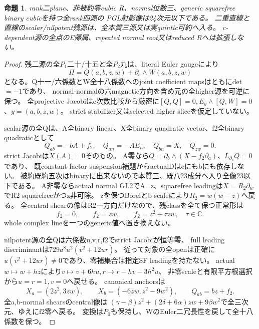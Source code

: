 \documentclass[a4paper,11pt]{ltjsarticle}
\newtheorem{proposition}{命題}[section]
\theoremstyle{definition}
\begin{document}
\begin{proposition}\label{prop:plane-nonreduced-m3-squarefree-all-G}
rank二plane、非被約零cubic R、normal位数三、generic squarefree binary cubicを持つ全rank四源の
PGL射影像は24次元以下である。
二重直線と直線のscalar/nilpotent残源は、全本質三源又は実quintic可約へ入る。
c-dependent源の全点のE帰属、repeated normal root又はreduced Rへは拡張しない。
\end{proposition}
\begin{proof}
残二源の全$P_1$二十/十五と全$P_2$九は、literal Euler gaugeにより
\[
 \Pi=Q(a,b,z,w)+\partial_c\wedge W(a,b,z,w)
\]
となる。Q十一/六係数とW全十八係数へのjoint coefficient mapsはともにdet$=-1$であり、
normal-normalの六magnetic方向を含め元の全higher源を可逆に保つ。
全projective Jacobiはc次数比較から厳密に$[Q,Q]=0,E_y\wedge[Q,W]=0$、$y=(a,b,z,w)$。
strict stabilizer又はselected higher sliceを仮定していない。

scalar源の全Qは、A全binary linear、X全binary quadratic vector、f2全binary quadraticとして
\[
 Q_{ab}=-bA+f_2,\quad Q_{an}=-A E_n,\quad Q_{bn}=X,\quad Q_{zw}=0.
\]
strict Jacobiは$X(A)=0$そのもの。
A零なら$Q=\partial_b\wedge(X-f_2\partial_a)$、$L_{\partial_b}Q=0$であり、
既constant-factor suspension補題からactualDはcにもbにも依存しない。
被約既約五次はbinaryに出来ないので本質三、既八23成分へ入り全像23以下である。
A非零ならactual normal GL2でA=z、squarefree leadingは$X=R_2\partial_w$でR2 squarefreeかつz非可除。
zを保つBorelとb-scaleにより$R_2=w(w-z)$へ戻る。
全central shearの像はR2一方向だけなので、残classを全て保つ正常形は
\[
 f_2=0,\qquad f_2=zw,\qquad f_2=z^2+\tau zw,\quad\tau\in\mathbb C.
\]
whole complex lineを一つのgeneric値へ置き換えない。

nilpotent源の全Qは六係数u,v,r,f2でstrict Jacobiが恒等零、
full leading discriminantは$729a^8u^2(v^2+12ur)$。
従って対象の全openは正確に$u(v^2+12ur)\ne0$であり、零補集合は指定SF leadingを持たない。
actual$w\mapsto w+hz$により$v\mapsto v+6hu,r\mapsto r-hv-3h^2u$、
非零scaleと有限平方根選択から$u=r=1,v=0$へ戻せる。
canonical anchorsは
\[
 X_a=(2z^2,3zw),\qquad X_b=(-6zw,z^2-9w^2),\qquad Q_{ab}=bz+f_2.
\]
全a,b-normal shearsのcentral像は
$(\gamma-\beta)z^2+(2\delta+6\alpha)zw+9\beta w^2$で全三次元、ゆえにf2零へ戻る。
変換は$P_0$も保持し、WのEuler二冗長性を戻して全十八係数を保つ。


\end{proof}
\end{document}
